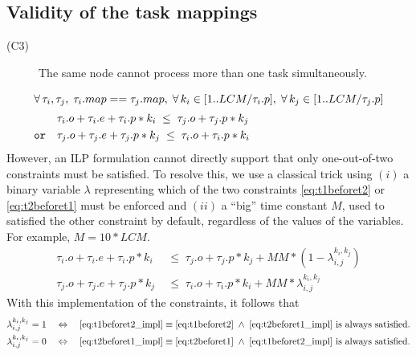 \subsection*{Validity of the task mappings}\label{sec:task_mapping}
\begin{description}
	\item[(C3)]The same node cannot process more than one task simultaneously.
\end{description}
\begin{align}
\intertext{%
$	\forall\, \tau_i, \tau_j, \; \tau_i.map == \tau_j.map, \;
	\forall\, k_i \in [1..LCM/\tau_i.p], \; \forall\, k_j \in [1..LCM/\tau_j.p]$}
\label{eq:t1beforet2}
&	\tau_i.o + \tau_i.e + \tau_i.p*k_i \; \leq \; \tau_j.o + \tau_j.p*k_j \\
\label{eq:t2beforet1}
\texttt{or} \quad
&	\tau_j.o + \tau_j.e + \tau_j.p*k_j \; \leq \; \tau_i.o + \tau_i.p*k_i
\end{align}
%
However, an ILP formulation cannot directly support that only one-out-of-two constraints must be satisfied. To resolve this, we use a classical trick using $(i)$ a binary variable $\lambda$ representing which of the two constraints \eqref{eq:t1beforet2} or \eqref{eq:t2beforet1} must be enforced and $(ii)$ a ``big'' time constant $M$, used to satisfied the other constraint by default, \ie regardless of the values of the variables. For example, $M = 10*LCM$.
%
\begin{align}
\label{eq:t1beforet2_impl}
\tau_i.o + \tau_i.e + \tau_i.p*k_i
	&\; \leq \; \tau_j.o + \tau_j.p*k_j + M\!M * (1 - \lambda_{i,j}^{k_i,k_j}) \\
\label{eq:t2beforet1_impl}
\tau_j.o + \tau_j.e + \tau_j.p*k_j
	&\; \leq \; \tau_i.o + \tau_i.p*k_i + M\!M * \lambda_{i,j}^{k_i,k_j}
\end{align}
%
With this implementation of the constraints, it follows that
%
\begin{align*}
&	\lambda_{i,j}^{k_i,k_j} = 1
	\quad \Leftrightarrow \quad
		\eqref{eq:t1beforet2_impl} \equiv \eqref{eq:t1beforet2}
		\;\wedge\;
		\eqref{eq:t2beforet1_impl} \text{ is always satisfied.}
		\\
&	\lambda_{i,j}^{k_i,k_j} = 0
	\quad \Leftrightarrow \quad
		\eqref{eq:t2beforet1_impl} \equiv \eqref{eq:t2beforet1}
		\;\wedge\;
		\eqref{eq:t1beforet2_impl} \text{ is always satisfied.}
\end{align*}






